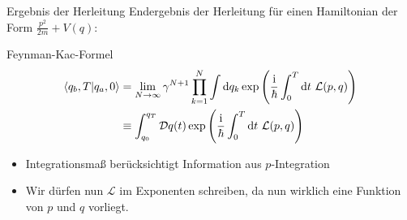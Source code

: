 
\begin{frame}{Ergebnis der Herleitung}
Endergebnis der Herleitung für einen Hamiltonian der Form $\frac{p^2}{2m} + V(q)$:
\begin{block}{Feynman-Kac-Formel}
\begin{align*}
	 \braket{q_b,T}{q_a,0} &= \lim_{N \rightarrow\infty} \gamma^{N+1}\prod_{k=1}^{N} \int\dd q_k \exp\left(\frac{\mathrm{i}}{\hbar}\int_{0}^{T}\dd t \ \mathcal{L}(p,q)\right) \\
	 &\equiv \int_{q_0}^{q_T} \mathcal{D}q(t) \exp\left(\frac{\mathrm{i}}{\hbar}\int_{0}^{T}\dd t \ \mathcal{L}(p,q)\right)
\end{align*}	
\end{block}
\begin{itemize}
	\item Integrationsmaß berücksichtigt Information aus $p$-Integration 
	\item Wir dürfen nun $\mathcal{L}$ im Exponenten schreiben, da nun wirklich eine Funktion von $p$ und $q$ vorliegt.
\end{itemize}	
\end{frame}